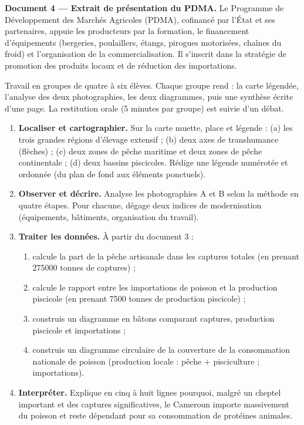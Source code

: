 \documentclass[11pt]{article}
\newcommand{\cle}[1]{{\popxbold\color{popdark}#1}}
\newcounter{popsec}
\newcounter{popsub}
\newcommand{\courssub}[1]{%
  \stepcounter{popsub}%
  \par\vspace{9pt}\noindent{\popxbold\fontsize{11.5}{13}\selectfont\color{popink}{\color{poporange}\thepopsec.\thepopsub}\hspace{6pt}#1}\par\nopagebreak\vspace{4pt}
}
\begin{document}
\textbf{Document 4 — Extrait de présentation du PDMA.} Le \cle{Programme de Développement des Marchés Agricoles} (PDMA), cofinancé par l'État et ses partenaires, appuie les producteurs par la formation, le financement d'équipements (bergeries, poulaillers, étangs, pirogues motorisées, chaînes du froid) et l'organisation de la commercialisation. Il s'inscrit dans la stratégie de promotion des produits locaux et de réduction des importations.

\courssub{Consignes}

Travail en groupes de quatre à six élèves. Chaque groupe rend : la carte légendée, l'analyse des deux photographies, les deux diagrammes, puis une synthèse écrite d'une page. La restitution orale (5 minutes par groupe) est suivie d'un débat.

\begin{enumerate}
\item \textbf{Localiser et cartographier.} Sur la carte muette, place et légende : (a) les trois grandes régions d'élevage extensif ; (b) deux axes de transhumance (flèches) ; (c) deux zones de pêche maritime et deux zones de pêche continentale ; (d) deux bassins piscicoles. Rédige une légende numérotée et ordonnée (du plan de fond aux éléments ponctuels).
\item \textbf{Observer et décrire.} Analyse les photographies A et B selon la méthode en quatre étapes. Pour chacune, dégage deux indices de \cle{modernisation} (équipements, bâtiments, organisation du travail).
\item \textbf{Traiter les données.} À partir du document 3 :
\begin{enumerate}
\item calcule la part de la pêche artisanale dans les captures totales (en prenant \num{275000} tonnes de captures) ;
\item calcule le rapport entre les importations de poisson et la production piscicole (en prenant \num{7500} tonnes de production piscicole) ;
\item construis un \cle{diagramme en bâtons} comparant captures, production piscicole et importations ;
\item construis un \cle{diagramme circulaire} de la couverture de la consommation nationale de poisson (production locale : pêche + pisciculture ; importations).
\end{enumerate}
\item \textbf{Interpréter.} Explique en cinq à huit lignes pourquoi, malgré un cheptel important et des captures significatives, le Cameroun importe massivement du poisson et reste dépendant pour sa consommation de protéines animales.

\end{enumerate}
\end{document}
